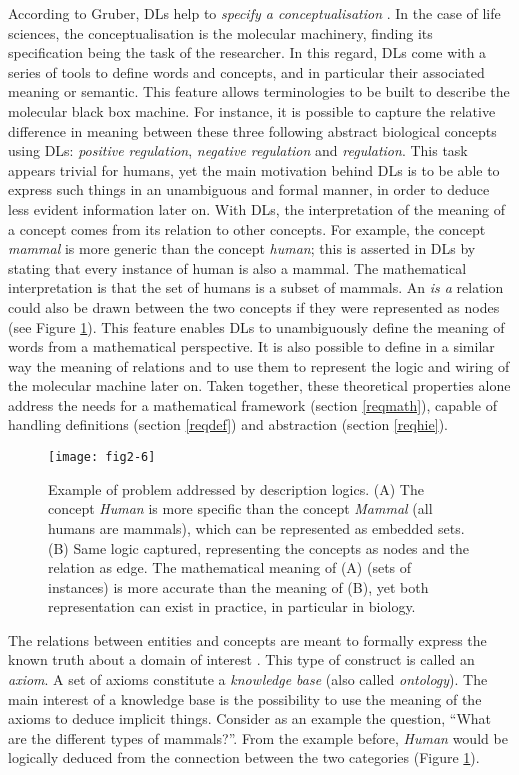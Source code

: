 According to Gruber, DLs help to \emph{specify a conceptualisation} \citep{gruber2009encyclopedia}. In the case of life sciences, the conceptualisation is the molecular machinery, finding its specification being the task of the researcher. In this regard, DLs come with a series of tools to define words and concepts, and in particular their associated meaning or semantic. This feature allows terminologies to be built to describe the molecular black box machine. For instance, it is possible to capture the relative difference in meaning between these three following abstract biological concepts using DLs: \emph{positive regulation}, \emph{negative regulation} and \emph{regulation}. This task appears trivial for humans, yet the main motivation behind DLs is to be able to express such things in an unambiguous and formal manner, in order to deduce less evident information later on. With DLs, the interpretation of the meaning of a concept comes from its relation to other concepts. For example, the concept \emph{mammal} is more generic than the concept \emph{human}; this is asserted in DLs by stating that every instance of human is also a mammal. The mathematical interpretation is that the set of humans is a subset of mammals. An \emph{is a} relation could also be drawn between the two concepts if they were represented as nodes (see Figure \ref{fig2-6}). This feature enables DLs to unambiguously define the meaning of words from a mathematical perspective. It is also possible to define in a similar way the meaning of relations and to use them to represent the logic and wiring of the molecular machine later on. Taken together, these theoretical properties alone address the needs for a mathematical framework (section \ref{reqmath}), capable of handling definitions (section \ref{reqdef}) and abstraction (section \ref{reqhie}).

\begin{figure}[ht]
    \centering
    \texttt{[image: fig2-6]}
    \caption{Example of problem addressed by description logics. (A) The concept \emph{Human} is more specific than the concept \emph{Mammal} (all humans are mammals), which can be represented as embedded sets. (B) Same logic captured, representing the concepts as nodes and the relation as edge. The mathematical meaning of (A) (sets of instances) is more accurate than the meaning of (B), yet both representation can exist in practice, in particular in biology.}
    \label{fig2-6}
\end{figure}

The relations between entities and concepts are meant to formally express the known truth about a domain of interest \citep{stevens2007using} \citep{krotzsch2012owl} \citep{hitzler2009owl}. This type of construct is called an \emph{axiom}. A set of axioms constitute a \emph{knowledge base} (also called \emph{ontology}). The main interest of a knowledge base is the possibility to use the meaning of the axioms to deduce implicit things. Consider as an example the question, ``What are the different types of mammals?''. From the example before, \emph{Human} would be logically deduced from the connection between the two categories (Figure \ref{fig2-6}).

